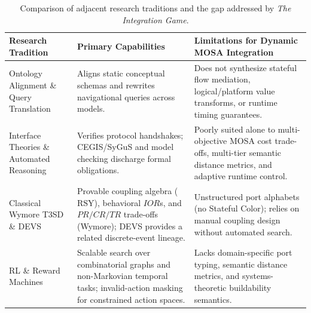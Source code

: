 \begin{table}[t]
\centering
\caption{Comparison of adjacent research traditions and the gap addressed by \emph{The Integration Game}.}
\label{tab:related-work}
\footnotesize
\begin{tabularx}{\linewidth}{@{}>{\raggedright\arraybackslash}p{3.1cm} >{\raggedright\arraybackslash}p{4.3cm} >{\raggedright\arraybackslash}X@{}}
\toprule
\textbf{Research Tradition} & \textbf{Primary Capabilities} & \textbf{Limitations for Dynamic MOSA Integration} \\
\midrule
Ontology Alignment \& Query Translation~\cite{rahm2001schema, lenzerini2002data, xiao2018ontology, mckibben2026alignment, mckibben2026nearring} & Aligns static conceptual schemas and rewrites navigational queries across models. & Does not synthesize stateful flow mediation, logical/platform value transforms, or runtime timing guarantees. \\
\addlinespace[2pt]
Interface Theories \& Automated Reasoning~\cite{deAlfaroHenzinger2001, BenvenisteEtAl2018, SpalazzeseInverardi2010, SolarLezama2008Sketch, AlurEtAl2013SyGuS} & Verifies protocol handshakes; CEGIS/SyGuS and model checking discharge formal obligations. & Poorly suited alone to multi-objective MOSA cost trade-offs, multi-tier semantic distance metrics, and adaptive runtime control. \\
\addlinespace[2pt]
Classical Wymore T3SD~\cite{Wymore1993, salado2019wymore} \& DEVS~\cite{ZeiglerPraehoferKim2000, wach2021devs} & Provable coupling algebra ($\mathrm{RSY}$), behavioral $IOR$s, and $PR/CR/TR$ trade-offs (Wymore); DEVS provides a related discrete-event lineage. & Unstructured port alphabets (no Stateful Color); relies on manual coupling design without automated search. \\
\addlinespace[2pt]
RL \& Reward Machines~\cite{Mirhoseini2021, ToroIcarte2022, Camacho2019LTL, Schulman2017PPO, Huang2022Masking} & Scalable search over combinatorial graphs and non-Markovian temporal tasks; invalid-action masking for constrained action spaces. & Lacks domain-specific port typing, semantic distance metrics, and systems-theoretic buildability semantics. \\
\bottomrule
\end{tabularx}
\end{table}
